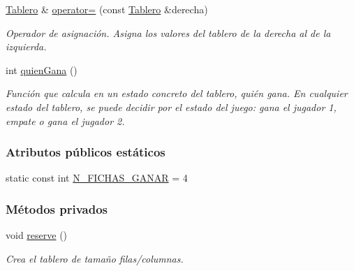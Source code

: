 \begin{DoxyCompactItemize}
\hyperlink{classTablero}{Tablero} \& \hyperlink{classTablero_abd7c6bb5bc26c0500308848399e1fd4f}{operator=} (const \hyperlink{classTablero}{Tablero} \&derecha)
\begin{DoxyCompactList}\small\item\em Operador de asignación. Asigna los valores del tablero de la derecha al de la izquierda. \end{DoxyCompactList}\item 
int \hyperlink{classTablero_a5de543f8186142731ab3ac77944a11b1}{quien\+Gana} ()
\begin{DoxyCompactList}\small\item\em Función que calcula en un estado concreto del tablero, quién gana. En cualquier estado del tablero, se puede decidir por el estado del juego\+: gana el jugador 1, empate o gana el jugador 2. \end{DoxyCompactList}\end{DoxyCompactItemize}
\subsubsection*{Atributos públicos estáticos}
\begin{DoxyCompactItemize}
\item 
static const int \hyperlink{classTablero_aa38ed353bef45bd6c5a2e3aa4a897720}{N\+\_\+\+F\+I\+C\+H\+A\+S\+\_\+\+G\+A\+N\+AR} = 4
\end{DoxyCompactItemize}
\subsubsection*{Métodos privados}
\begin{DoxyCompactItemize}
\item 
void \hyperlink{classTablero_ac2a20883f540c4d010dafab236390cb3}{reserve} ()
\begin{DoxyCompactList}\small\item\em Crea el tablero de tamaño filas/columnas. \end{DoxyCompactList}\end{DoxyCompactItemize}

